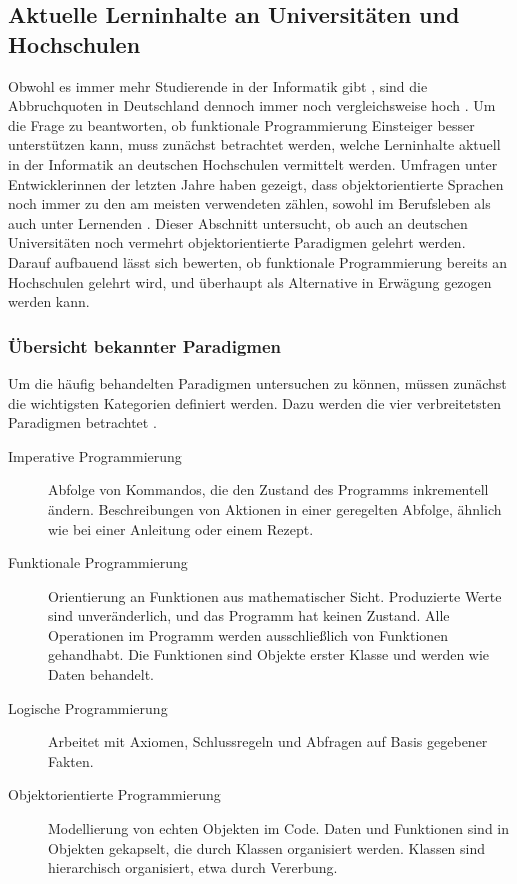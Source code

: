 \subsection{Aktuelle Lerninhalte an Universitäten und Hochschulen}
Obwohl es immer mehr Studierende in der Informatik gibt \cite{destatis}, sind die Abbruchquoten in Deutschland dennoch immer noch vergleichsweise hoch \cite{dhzw}. Um die Frage zu beantworten, ob funktionale Programmierung Einsteiger besser unterstützen kann, muss zunächst betrachtet werden, welche Lerninhalte aktuell in der Informatik an deutschen Hochschulen vermittelt werden.
Umfragen unter Entwicklerinnen der letzten Jahre haben gezeigt, dass objektorientierte Sprachen noch immer zu den am meisten verwendeten zählen, sowohl im Berufsleben als auch unter Lernenden \cite{stackoverflow}. Dieser Abschnitt untersucht, ob auch an deutschen Universitäten noch vermehrt objektorientierte Paradigmen gelehrt werden.
Darauf aufbauend lässt sich bewerten, ob funktionale Programmierung bereits an Hochschulen gelehrt wird, und überhaupt als Alternative in Erwägung gezogen werden kann.

\subsubsection{Übersicht bekannter Paradigmen}
Um die häufig behandelten Paradigmen untersuchen zu können, müssen zunächst die wichtigsten Kategorien definiert werden. Dazu werden die vier verbreitetsten Paradigmen betrachtet \cite{normak}.

\begin{description}
    \item[Imperative Programmierung] Abfolge von Kommandos, die den Zustand des Programms inkrementell ändern. Beschreibungen von Aktionen in einer geregelten Abfolge, ähnlich wie bei einer Anleitung oder einem Rezept.
    \item[Funktionale Programmierung] Orientierung an Funktionen aus mathematischer Sicht. Produzierte Werte sind unveränderlich, und das Programm hat keinen Zustand. Alle Operationen im Programm werden ausschließlich von Funktionen gehandhabt. Die Funktionen sind Objekte erster Klasse und werden wie Daten behandelt.
    \item[Logische Programmierung] Arbeitet mit Axiomen, Schlussregeln und Abfragen auf Basis gegebener Fakten.
    \item[Objektorientierte Programmierung] Modellierung von echten Objekten im Code. Daten und Funktionen sind in Objekten gekapselt, die durch Klassen organisiert werden. Klassen sind hierarchisch organisiert, etwa durch Vererbung.
\end{description}

